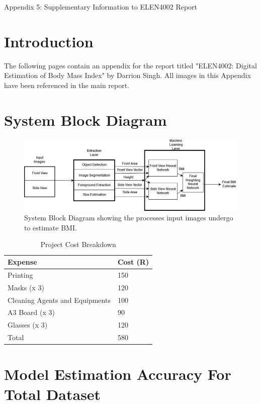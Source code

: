 \documentclass[conference]{IEEEtran}
\begin{document}
\onecolumn
\begin{center}
\LARGE Appendix 5: Supplementary Information to ELEN4002 Report
\end{center}
\section{Introduction}
The following pages contain an appendix for the report titled "ELEN4002: Digital Estimation of Body Mass Index" by Darrion Singh.
All images in this Appendix have been referenced in the main report.
\section{System Block Diagram}
\begin{figure}[H]
    \centering
    \includegraphics[width=\linewidth]{systemblock.png}
    \caption{System Block Diagram showing the processes input images undergo to estimate BMI.}
    \label{fig:systemblockdiagram}
\end{figure}

\begin{table}[h]
    \centering
    \caption{Project Cost Breakdown}
    \label{tab:budget}
    \begin{tabular}{ll} \hline
    \textbf{Expense} & \textbf{Cost (R)} \\ \hline
    Printing & 150 \\
    Masks (x 3) & 120 \\
    Cleaning Agents and Equipments & 100 \\
    A3 Board (x 3) & 90 \\
    Glasses (x 3) & 120 \\ \hline
    \multicolumn{1}{l|}{Total} & \multicolumn{1}{l}{580} \\ \hline
    \end{tabular}
\end{table}

\section{Model Estimation Accuracy For Total Dataset}
\end{document}

